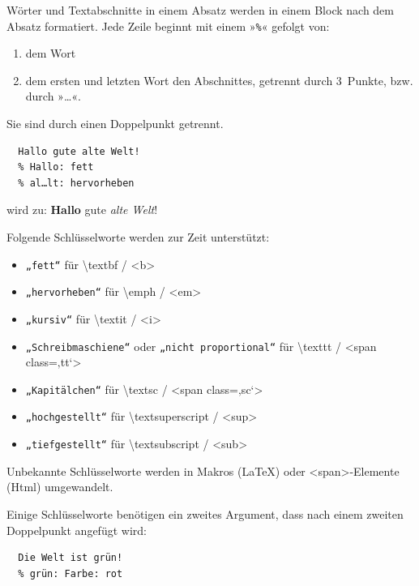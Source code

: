 \documentclass{scrartcl}
\begin{document}
{Wörter und Textabschnitte in einem Absatz werden in einem
Block nach dem Absatz formatiert. Jede Zeile beginnt mit
einem »\texttt{\%}« gefolgt von:\\}

\begin{enumerate}
\item dem Wort
\item dem ersten und letzten Wort den Abschnittes,
  getrennt durch 3~Punkte, bzw. durch »…«.
\end{enumerate}


{Sie sind durch einen Doppelpunkt getrennt.\\}

\begin{verbatim}
  Hallo gute alte Welt!
  % Hallo: fett
  % al…lt: hervorheben
\end{verbatim}


{wird zu:
\textbf{Hallo} gute \emph{alte Welt}!\\}

{Folgende Schlüsselworte werden zur Zeit unterstützt:\\}

\begin{itemize}
\item \texttt{„fett“} für \textbackslash textbf / <b>
\item \texttt{„hervorheben“} für \textbackslash emph / <em>
\item \texttt{„kursiv“} für \textbackslash textit / <i>
\item \texttt{„Schreibmaschiene“} oder \texttt{„nicht proportional“} für \textbackslash texttt / <span class=‚tt‘>
\item \texttt{„Kapitälchen“} für \textbackslash textsc / <span class=‚sc‘>
\item \texttt{„hochgestellt“} für \textbackslash textsuperscript / <sup>
\item \texttt{„tiefgestellt“} für \textbackslash textsubscript / <sub>
\end{itemize}


{Unbekannte Schlüsselworte werden in Makros (LaTeX) oder
<span>-Elemente (Html) umgewandelt.\\}

{Einige Schlüsselworte benötigen ein zweites Argument, dass
nach einem zweiten Doppelpunkt angefügt wird:\\}

\begin{verbatim}
  Die Welt ist grün!
  % grün: Farbe: rot
\end{verbatim}
\end{document}
